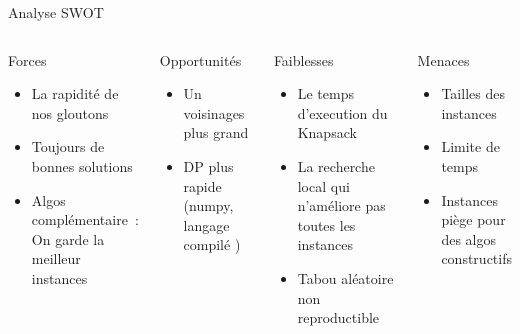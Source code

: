 \documentclass[aspectratio=169,xcolor=table]{pres}
\begin{document}
\begin{frame}{Analyse SWOT}
  \begin{columns}[T]
    \begin{block}{Forces}
      \begin{itemize}
        \item La rapidité de nos gloutons
        \item Toujours de bonnes solutions 
        \item Algos complémentaire : On garde la meilleur instances
      \end{itemize}
    \end{block}
    \begin{block}{Opportunités}
      \begin{itemize}
        \item Un voisinages plus grand 
        \item DP plus rapide (numpy, langage compilé )
      \end{itemize}
    \end{block}
    \begin{block}{Faiblesses}
      \begin{itemize}
        \item Le temps d’execution du Knapsack
        \item La recherche local qui n’améliore pas toutes les instances
        \item Tabou aléatoire non reproductible
      \end{itemize}
    \end{block}
    \begin{block}{Menaces}
      \begin{itemize}
        \item Tailles des instances
        \item Limite de temps
        \item Instances piège pour des algos constructifs
      \end{itemize}
    \end{block}
  \end{columns}
\end{frame}
\end{document}
